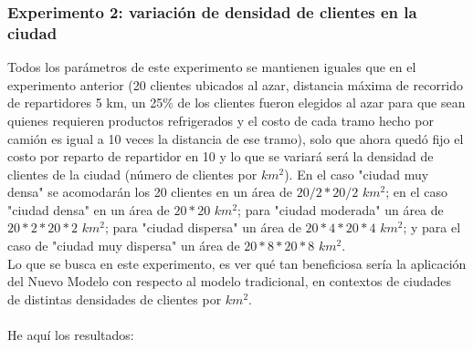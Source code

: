 \documentclass{article}
\begin{document}
\subsubsection{Experimento 2: variación de densidad de clientes en la ciudad}

Todos los parámetros de este experimento se mantienen iguales que en el experimento anterior (20 clientes ubicados al azar, distancia máxima de recorrido de repartidores 5 km, un 25\% de los clientes fueron elegidos al azar para que sean quienes requieren productos refrigerados y el costo de cada tramo hecho por camión es igual a 10 veces la distancia de ese tramo), solo que ahora quedó fijo el costo por reparto de repartidor en 10 y lo que se variará será la densidad de clientes de la ciudad (número de clientes por $km^{2}$). En el caso "ciudad muy densa" se acomodarán los 20 clientes en un área de  $20/2 * 20/2$ $km^{2}$; en el caso "ciudad densa" en un área de $20 * 20$ $km^{2}$; para "ciudad moderada" un área de $20*2 * 20*2$ $km^{2}$; para "ciudad dispersa" un área de $20*4 * 20*4$ $km^{2}$; y para el caso de "ciudad muy dispersa" un área de $20*8 * 20*8$ $km^{2}$.  \\
Lo que se busca en este experimento, es ver qué tan beneficiosa sería la aplicación del Nuevo Modelo con respecto al modelo tradicional, en contextos de ciudades de distintas densidades de clientes por $km^{2}$. \\
\\
He aquí los resultados:

\begin{table}[H]
\centering
{}
\caption{Comparación de costos entre metodologías para distintas densidades de clientes por $km^{2}$}
\end{table}
\end{document}
